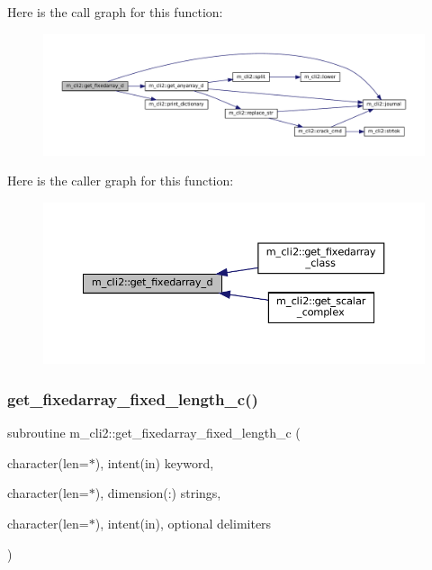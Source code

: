 Here is the call graph for this function\+:\nopagebreak
\begin{figure}[H]
\begin{center}
\leavevmode
\includegraphics[width=350pt]{namespacem__cli2_a2c8db0f383888cb2b3ce8643de3fae93_cgraph}
\end{center}
\end{figure}
Here is the caller graph for this function\+:\nopagebreak
\begin{figure}[H]
\begin{center}
\leavevmode
\includegraphics[width=350pt]{namespacem__cli2_a2c8db0f383888cb2b3ce8643de3fae93_icgraph}
\end{center}
\end{figure}
\mbox{\label{namespacem__cli2_a8000c5e05f6c84ba17350d4a00850a6a}} 
\subsubsection{\texorpdfstring{get\+\_\+fixedarray\+\_\+fixed\+\_\+length\+\_\+c()}{get\_fixedarray\_fixed\_length\_c()}}
{\footnotesize\ttfamily subroutine m\+\_\+cli2\+::get\+\_\+fixedarray\+\_\+fixed\+\_\+length\+\_\+c (\begin{DoxyParamCaption}\item[{character(len=$\ast$), intent(in)}]{keyword,  }\item[{character(len=$\ast$), dimension(\+:)}]{strings,  }\item[{character(len=$\ast$), intent(in), optional}]{delimiters }\end{DoxyParamCaption})\hspace{0.3cm}{\ttfamily [private]}}



